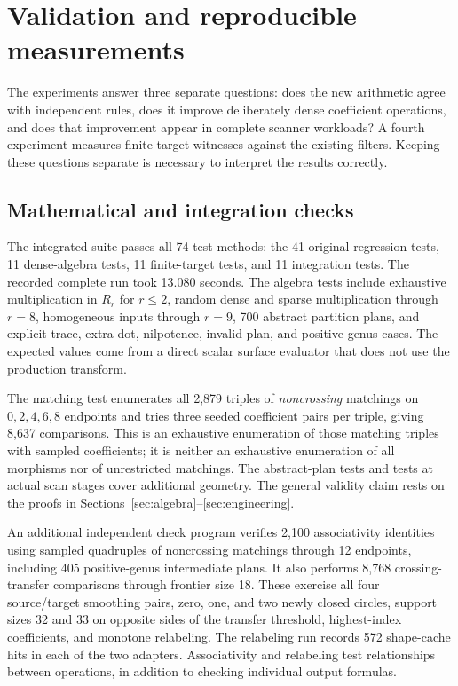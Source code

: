 \section{Validation and reproducible measurements}
\label{sec:experiments}

The experiments answer three separate questions: does the new arithmetic
agree with independent rules, does it improve deliberately dense
coefficient operations, and does that improvement appear in complete
scanner workloads? A fourth experiment measures finite-target witnesses
against the existing filters. Keeping these questions separate is
necessary to interpret the results correctly.

\subsection{Mathematical and integration checks}

The integrated suite passes all 74 test methods: the 41 original
regression tests, 11 dense-algebra tests, 11 finite-target tests, and
11 integration tests. The recorded complete run took 13.080 seconds.
The algebra tests include exhaustive multiplication in $R_r$ for
$r\leq2$, random dense and sparse multiplication through $r=8$,
homogeneous inputs through $r=9$, 700 abstract partition plans, and
explicit trace, extra-dot, nilpotence, invalid-plan, and positive-genus
cases. The expected values come from a direct scalar surface evaluator
that does not use the production transform.

The matching test enumerates all 2,879 triples of \emph{noncrossing}
matchings on $0,2,4,6,8$ endpoints and tries three seeded coefficient
pairs per triple, giving 8,637 comparisons. This is an exhaustive
enumeration of those matching triples with sampled coefficients; it is
neither an exhaustive enumeration of all morphisms nor of unrestricted
matchings. The abstract-plan tests and tests at actual scan stages cover
additional geometry. The general validity claim rests on the proofs in
Sections~\ref{sec:algebra}--\ref{sec:engineering}.

An additional independent check program verifies 2,100 associativity
identities using sampled quadruples of noncrossing matchings through
12 endpoints, including 405 positive-genus intermediate plans. It also
performs 8,768 crossing-transfer comparisons through frontier size 18.
These exercise all four source/target smoothing pairs, zero, one, and
two newly closed circles, support sizes 32 and 33 on opposite sides of
the transfer threshold, highest-index coefficients, and monotone
relabeling. The relabeling run records 572 shape-cache hits in each of
the two adapters. Associativity and relabeling test relationships between
operations, in addition to checking individual output formulas.

